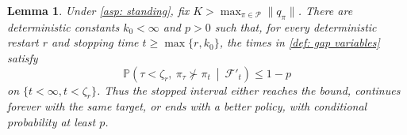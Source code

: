 \documentclass[twoside,11pt]{article}
\newtheorem{lemma}[lemma]{Lemma}
\DeclareRobustCommand{\reviewbarstart}{%
  \ifhmode %
    \vadjust{\vbox to 0pt{%
      \vskip-\ht\strutbox %
      \vskip-\dp\strutbox %
      \cbstart[\changebarwidth] %
      \vss %
    }}%
  \else %
    \cbstart[\changebarwidth]%
  \fi %
} %
\providecommand{\DIFadd}[1]{#1} %
\providecommand{\DIFaddbegin}{\reviewbarstart} %
\providecommand{\DIFaddend}{\protect\cbend} %
\def\DIFadd#1{#1}%
\def\DIFaddbegin{}%
\def\DIFaddend{}%
\begin{document}
 \DIFaddbegin \begin{lemma}
\label{thm: fixed prob that bad actions dont become greedy}
\DIFadd{Under \autoref{asp: standing}, fix $K>\max_{\pi\in\mathcal P}\|q_\pi\|$. There are deterministic constants $k_0<\infty$ and $p>0$ such that, for every deterministic restart $r$ and stopping time $t\ge\max\{r,k_0\}$, }\DIFaddend the  \DIFaddbegin \DIFadd{times in \autoref{def: gap variables} satisfy
}\begin{equation}
\DIFadd{\label{eq:progress}
\mathbb P\!\left(\tau<\zeta_r,\ \pi_\tau\not\succ\pi_t
\ \middle|\ \mathcal F'_t\right)\le1-p
}\end{equation}\DIFaddend 
 \DIFaddbegin \DIFadd{on $\{t<\infty,t<\zeta_r\}$. Thus the stopped interval either reaches the bound, continues forever with the same target, or ends with a better policy, with conditional probability at least $p$.
}\DIFaddend \end{lemma}
\end{document}
